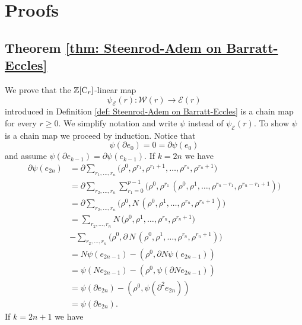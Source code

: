 
\section{Proofs}

\subsection{Theorem \ref{thm: Steenrod-Adem on Barratt-Eccles}}

We prove that the $\mathbb{Z}[\mathrm{C}_r]$-linear map
\begin{equation*}
\psi_{\mathcal E}(r) : \mathcal W(r) \to \mathcal E(r)
\end{equation*}
introduced in Definition \ref{def: Steenrod-Adem on Barratt-Eccles} is a chain map for every $r \geq 0$. We simplify notation and write $\psi$ instead of $\psi_{\mathcal E}(r)$. To show $\psi$ is a chain map we proceed by induction. Notice that
\begin{equation*}
\psi(\partial e_0) = 0 = \partial \psi(e_0)
\end{equation*}
and assume $\psi(\partial e_{k-1}) = \partial \psi(e_{k-1})$. If $k = 2n$ we have
\begin{align*}
\partial \psi(e_{2n}) & = 
\partial \sum_{r_1, \dots, r_n} 
\big(\rho^0, \rho^{r_1}, \rho^{r_1+1}, \dots, \rho^{r_n}, \rho^{r_n+1} \big)  \\ & =
\partial \sum_{r_2, \dots, r_n} \sum_{r_1 = 0}^{p-1}
\big(\rho^0, \rho^{r_1} \, (\rho^0, \rho^{1}, \dots, \rho^{r_n-r_1}, \rho^{r_n - r_1 +1}) \big) \\ & =
\partial \sum_{r_2, \dots, r_n}
\big(\rho^0, N\, (\rho^{0}, \rho^{1}, \dots, \rho^{r_n}, \rho^{r_n + 1}) \big) \\ & =
\sum_{r_2, \dots, r_n}
N\, \big( \rho^{0}, \rho^{1}, \dots, \rho^{r_n}, \rho^{r_n + 1} \big) \\ & -
\sum_{r_2, \dots, r_n}
\big(\rho^0, \partial \, N \, (\rho^{0}, \rho^{1}, \dots, \rho^{r_n}, \rho^{r_n+1}) \big) \\ & =
N \psi(e_{2n-1}) - (\rho^0, \partial N \psi (e_{2n-1})) \\ & =
\psi(N e_{2n-1}) - (\rho^0, \psi (\partial N e_{2n-1})) \\ & =
\psi(\partial e_{2n}) - (\rho^0, \psi (\partial^2 e_{2n})) \\ & =
\psi(\partial e_{2n}).
\end{align*}
If $k = 2n+1$ we have
